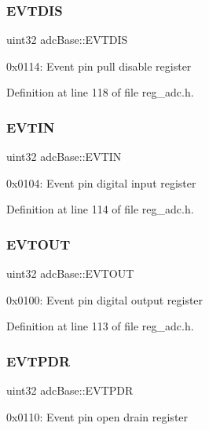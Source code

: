 \subsubsection{\texorpdfstring{E\+V\+T\+D\+IS}{EVTDIS}}
{\footnotesize\ttfamily uint32 adc\+Base\+::\+E\+V\+T\+D\+IS}

0x0114\+: Event pin pull disable register 

Definition at line 118 of file reg\+\_\+adc.\+h.

\mbox{\label{structadcBase_a7abea9d12bb1f9ba064f4ce9df651efd}} 
\subsubsection{\texorpdfstring{E\+V\+T\+IN}{EVTIN}}
{\footnotesize\ttfamily uint32 adc\+Base\+::\+E\+V\+T\+IN}

0x0104\+: Event pin digital input register 

Definition at line 114 of file reg\+\_\+adc.\+h.

\mbox{\label{structadcBase_a9f57384aecd485e5fc10ed8e78065f29}} 
\subsubsection{\texorpdfstring{E\+V\+T\+O\+UT}{EVTOUT}}
{\footnotesize\ttfamily uint32 adc\+Base\+::\+E\+V\+T\+O\+UT}

0x0100\+: Event pin digital output register 

Definition at line 113 of file reg\+\_\+adc.\+h.

\mbox{\label{structadcBase_a7a89221d09c925798ad5f2988067bbee}} 
\subsubsection{\texorpdfstring{E\+V\+T\+P\+DR}{EVTPDR}}
{\footnotesize\ttfamily uint32 adc\+Base\+::\+E\+V\+T\+P\+DR}

0x0110\+: Event pin open drain register 

